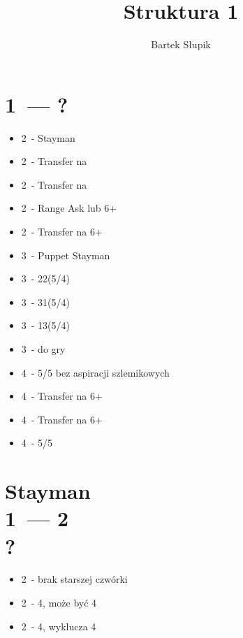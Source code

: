 \documentclass[12pt, a4paper]{article}
\title{Struktura 1\nt}
\author{Bartek Słupik}
\begin{document}
    \maketitle
    \section{1\ntx\ --- ?}
    \begin{itemize}
        \item 2\clubs\ - Stayman
        \item 2\diams\ - Transfer na \hearts
        \item 2\hearts\ - Transfer na \spades \br
        \item 2\spades\ - Range Ask lub 6+\clubs
        \item 2\nt\ - Transfer na 6+\diams
        \item 3\clubs\ - Puppet Stayman
        \item 3\diams\ - 22(5/4)
        \item 3\hearts\ - 31(5/4)
        \item 3\spades\ - 13(5/4)
        \item 3\nt\ - do gry \br
        \item 4\clubs\ - 5/5 \major bez aspiracji szlemikowych
        \item 4\diams\ - Transfer na 6+\hearts 
        \item 4\hearts\ - Transfer na 6+\spades
        \item 4\spades\ - 5/5 \minor
    \end{itemize}
    
    \pagebreak


    \section{Stayman \\ 1\ntx\ --- 2\clubs \\ ?}
    \begin{itemize}
        \item 2\diams\ - brak starszej czwórki
        \item 2\hearts\ - 4\hearts, może być 4\spades
        \item 2\spades\ - 4\spades, wyklucza 4\hearts
    \end{itemize}
\end{document}
